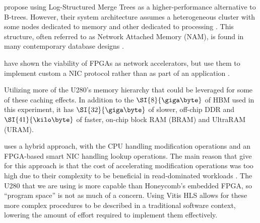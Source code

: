 

\citeauthor{dlsm} propose using Log-Structured Merge Trees as a
higher-performance alternative to B-trees. However, their system architecture
assumes a heterogeneous cluster with some nodes dedicated to memory and other
dedicated to processing \autocite{dlsm}. This structure, often referred to as
Network Attached Memory (NAM), is found in many contemporary database designs
\autocites{base,ma-tpds-2022}.



\citeauthor{star} have shown the viability of FPGAs as network accelerators, but
use them to implement custom a NIC protocol rather than as part of an
application \autocite{star}.

Utilizing more of the U280's memory hierarchy that could be leveraged for some
of these caching effects. In addition to the $\SI{8}{\giga\byte}$ of HBM used in
this experiment, it has $\SI{32}{\giga\byte}$ of slower, off-chip DDR and
$\SI{41}{\kilo\byte}$ of faster, on-chip block RAM (BRAM) and UltraRAM (URAM).

 uses a hybrid approach, with the CPU handling modification
operations and an FPGA-based smart NIC handling lookup operations. The main
reason that \citeauthor{honeycomb} give for this approach is that the cost of
accelerating modification operations was too high due to their complexity to be
beneficial in read-dominated workloads \autocite{honeycomb}. The U280 that we
are using is more capable than Honeycomb's embedded FPGA, so ``program space''
is not as much of a concern. Using Vitis HLS allows for these more complex
procedures to be described in a traditional software context, lowering the
amount of effort required to implement them effectively.
